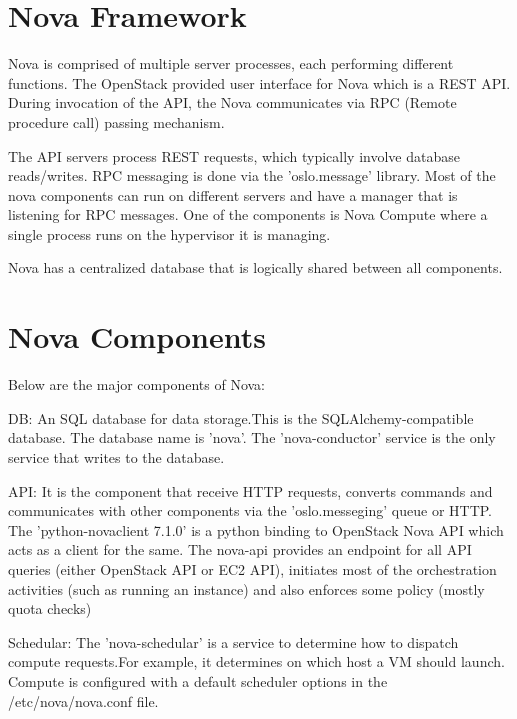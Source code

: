 \documentclass[9pt,twocolumn,twoside]{../../styles/osajnl}
\begin{document}
\section{Nova Framework}


Nova is comprised of multiple server processes, each performing different functions. The OpenStack provided user interface for Nova which is a REST API. During invocation of the API, the Nova communicates via  RPC (Remote procedure call) passing mechanism.

The API servers process REST requests, which typically involve database reads/writes. RPC messaging is done via the 'oslo.message' library. Most of the nova components can run on different servers and have a manager that is listening for RPC messages. One of the components is Nova Compute where a single process runs on the hypervisor it is managing.

Nova has a centralized database that is logically  shared between all components\cite{www-nova-pepple}.


\section{Nova Components}

Below are the major components of Nova:


\begin{flushleft}


DB: An SQL database for data storage.This is the SQLAlchemy-compatible database. The database name is 'nova'. The 'nova-conductor' service is the only service that writes to the database. 
\end{flushleft}

\begin{flushleft}
\item API: It is the component that receive HTTP requests, converts commands and communicates with other components via the 'oslo.messeging' queue or HTTP.
The 'python-novaclient 7.1.0' is a python binding to OpenStack Nova API which acts as a client for the same. The nova-api provides an endpoint for all API queries (either OpenStack API or EC2 API), initiates most of the orchestration activities (such as running an instance) and also enforces some policy (mostly quota checks)
\end{flushleft}

\begin{flushleft}

Schedular: The 'nova-schedular' is a service to determine how to dispatch compute requests.For example, it determines on which host a VM should launch. Compute is configured with a default scheduler options in the /etc/nova/nova.conf file\cite{www-nova-schedular}.
\end{flushleft}
\end{document}
